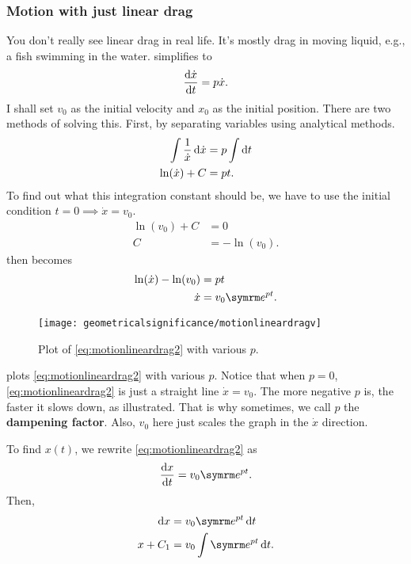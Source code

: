\subsubsection{Motion with just linear drag}

You don't really see linear drag in real life. It's mostly drag in moving liquid, e.g., a fish swimming in the water.  simplifies to
\begin{equation*}
    \odv{\dot{x}}{t} = p\dot{x}.
\end{equation*}
I shall set $v_0$ as the initial velocity and $x_0$ as the initial position. There are two methods of solving this. First, by separating variables using analytical methods.
\begin{align}
    \int\frac{1}{\dot{x}}\odif{\dot{x}} &= p\int\odif{t} \nonumber\\
    \ln(\dot{x}) + C &= pt. \label{eq:motionlineardrag1}
\end{align}
To find out what this integration constant should be, we have to use the initial condition $t = 0 \implies \dot{x} = v_0$.
\begin{align*}
    \ln(v_0) + C &= 0 \\
    C &= -\ln(v_0).
\end{align*}
 then becomes
\begin{align}
    \ln(\dot{x}) - \ln(v_0) &= pt \nonumber\\
    \dot{x} &= v_0\e^{pt}. \label{eq:motionlineardrag2}
\end{align}

\begin{figure}
    \centering
    \texttt{[image: geometricalsignificance/motionlineardragv]}
    \caption{Plot of \cref{eq:motionlineardrag2} with various $p$.}
    \label{fig:motionlineardragv}
\end{figure}
 plots \cref{eq:motionlineardrag2} with various $p$. Notice that when $p = 0$, \cref{eq:motionlineardrag2} is just a straight line $\dot{x} = v_0$. The more negative $p$ is, the faster it slows down, as illustrated. That is why sometimes, we call $p$ the \textbf{dampening factor}. Also, $v_0$ here just scales the graph in the $\dot{x}$ direction.

To find $x(t)$, we rewrite \cref{eq:motionlineardrag2} as
\begin{equation*}
    \odv{x}{t} = v_0\e^{pt}.
\end{equation*}
Then,
\begin{align}
    \odif{x} &= v_0\e^{pt}\odif{t} \\
    x + C_1 &= v_0\int \e^{pt}\odif{t}. \label{eq:motionlineardrag3}
\end{align}

